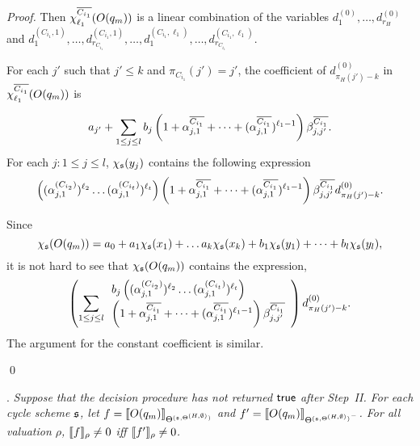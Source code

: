\begin{appendix}
\begin{proof}
{Then $\chi^{\overline{C_{i_1}}}_{\ell_1}(O(q_m))$ is a linear combination of the variables $d^{(0)}_1,\dots, d^{(0)}_{r_H}$ and $d^{(C_{i_1},1)}_1,\dots, d^{(C_{i_1},1)}_{r_{C_{i_1}}}, \dots, d^{(C_{i_1},\ell_1)}_1,\dots, d^{(C_{i_1},\ell_1)}_{r_{C_{i_1}}}$.

For each $j'$ such that $j' \le k$ and $\pi_{C_{i_1}}(j')=j'$, the coefficient of $d^{(0)}_{\pi_H(j')-k}$ in $\chi^{\overline{C_{i_1}}}_{\ell_1}(O(q_m))$ is 

\[a_{j'} + \sum \limits_{1 \le j \le l} b_j \left(1+\alpha^{\overline{C_{i_1}}}_{j,1} + \dots + (\alpha^{\overline{C_{i_1}}}_{j,1})^{\ell_1-1} \right) \beta^{\overline{C_{i_1}}}_{j,j'}.\]
%
%
For each $j: 1 \le j \le l$, $\chi_{{\mathfrak{s} }}(y_j)$ contains the following expression 
\[\left((\alpha^{(C_{i_2})}_{j,1})^{\ell_2} \dots (\alpha^{(C_{i_t})}_{j,1})^{\ell_t}\right)\left(1+\alpha^{\overline{C_{i_1}}}_{j,1} + \dots + (\alpha^{\overline{C_{i_1}}}_{j,1})^{\ell_1-1} \right) \beta^{\overline{C_{i_1}}}_{j,j'} d^{(0)}_{\pi_H(j')-k}.\]

Since 
\[
\chi_{{\mathfrak{s} }}(O(q_m)) = a_0 + a_1 \chi_{{\mathfrak{s} }}(x_1) + \dots a_k \chi_{{\mathfrak{s} }}(x_k) + b_1 \chi_{{\mathfrak{s} }}(y_1) + \dots + b_l \chi_{{\mathfrak{s} }}(y_l),
\] 
it is not hard to see that $\chi_{\mathfrak{s} }(O(q_m))$ contains the expression,
\[
\left(\sum \limits_{1 \le j \le l} 
\begin{array}{l}
b_j \left((\alpha^{(C_{i_2})}_{j,1})^{\ell_2} \dots (\alpha^{(C_{i_t})}_{j,1})^{\ell_t}\right) \\
\left(1+\alpha^{\overline{C_{i_1}}}_{j,1} + \dots + (\alpha^{\overline{C_{i_1}}}_{j,1})^{\ell_1-1} \right) \beta^{\overline{C_{i_1}}}_{j,j'}
\end{array}
\right) d^{(0)}_{\pi_H(j')-k}. 
\]
The argument for the constant coefficient is similar.}
\qed
\end{proof}


\smallskip

.
{\it	Suppose that the decision procedure has not returned $\mathsf{true}$ after Step~II. For each cycle scheme ${\mathfrak{s} }$, let $f=\llbracket O(q_m)\rrbracket_{\Theta^{({\mathfrak{s} }, \Theta^{(H,\emptyset)})}}$ and $f'=\llbracket O(q_m)\rrbracket_{{\Theta^{({\mathfrak{s} }, \Theta^{(H,\emptyset)})}}^-}$. For all valuation $\rho$, $\llbracket f\rrbracket_{\rho}\neq 0$ iff $\llbracket f'\rrbracket_{\rho} \neq 0$.
}



\end{appendix}
